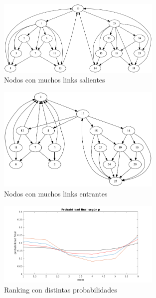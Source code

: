 \begin{figure}[H]
	\centering
	\includegraphics[width=0.7\textwidth]{img/links_salientes_25.png}
	\caption{Nodos con muchos links salientes}
	\label{fig:Ranking nodos con muchos links salientes}
\end{figure}



\begin{figure}[H]
	\centering
	\includegraphics[width=0.7\textwidth]{img/links_entrantes_25.png}
	\caption{Nodos con muchos links entrantes}
	\label{fig:Ranking nodos con muchos links entrantes}
\end{figure}


\begin{figure}[H]
	\centering
	\includegraphics[width=0.7\textwidth]{img/comparativo.png}
	\caption{Ranking con distintas probabilidades}
	\label{fig:Ranking con distintas probabilidades}
\end{figure}